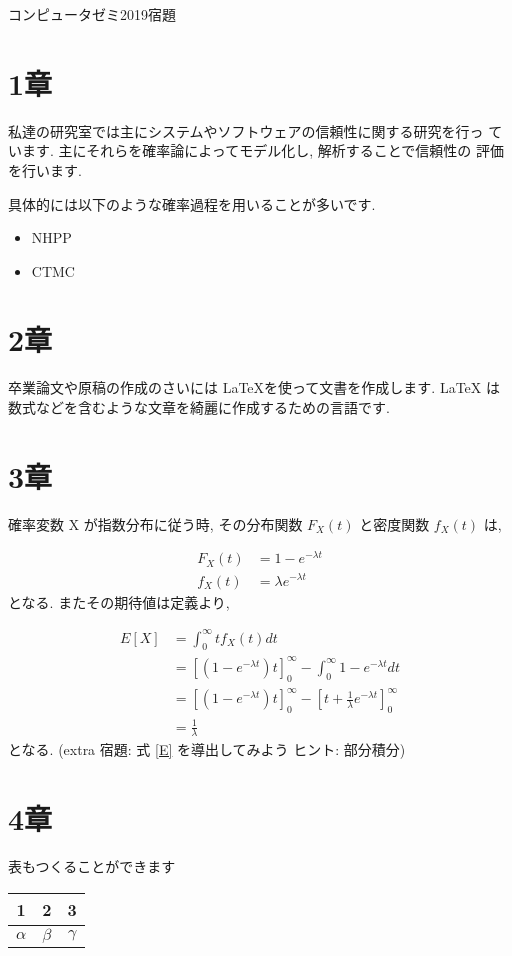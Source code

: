\documentclass[a4paper,12pt]{article}
\begin{document}
\begin{center}
コンピュータゼミ2019宿題{\large}
\end{center}

\section{1章}
私達の研究室では主にシステムやソフトウェアの信頼性に関する研究を行っ
ています. 主にそれらを確率論によってモデル化し, 解析することで信頼性の
評価を行います. \par
具体的には以下のような確率過程を用いることが多いです.
\begin{itemize}
\item NHPP
\item CTMC
\end{itemize}

\section{2章}
卒業論文や原稿の作成のさいには \LaTeX を使って文書を作成します. \LaTeX
は数式などを含むような文章を綺麗に作成するための言語です.

\section{3章}
確率変数 X が指数分布に従う時, その分布関数 $F_X(t)$ と密度関数 $f_X(t)$ は, 

\begin{align}
F_X(t)  &=  1-e^{-\lambda t} \label{F_X} \\
f_X(t)  &=  \lambda e^{-\lambda t} \label{f_X} 
\end{align}
となる. またその期待値は定義より,

\begin{align}
E[X]  &= \int_{0}^{\infty} t f_X(t) dt \nonumber\\
      &= [(1-e^{-\lambda t})t]_{0}^{\infty}-\int_{0}^{\infty}1-e^{-\lambda t} dt \nonumber\\
      &= [(1-e^{-\lambda t})t]_{0}^{\infty} - [t + \frac{1}{\lambda}e^{-\lambda t}]_{0}^{\infty} \nonumber\\
      &= \frac{1}{\lambda} \label{E} 
\end{align}
となる. (extra 宿題: 式 \ref{E} を導出してみよう ヒント: 部分積分)

\section{4章}
表もつくることができます
\begin{center}
\begin{tabular}{|c|c|c|}\hline
 1 & 2 & 3\\\hline
 $\alpha$ & $\beta$ & $\gamma$\\\hline
\end{tabular}
\end{center}
\end{document}
